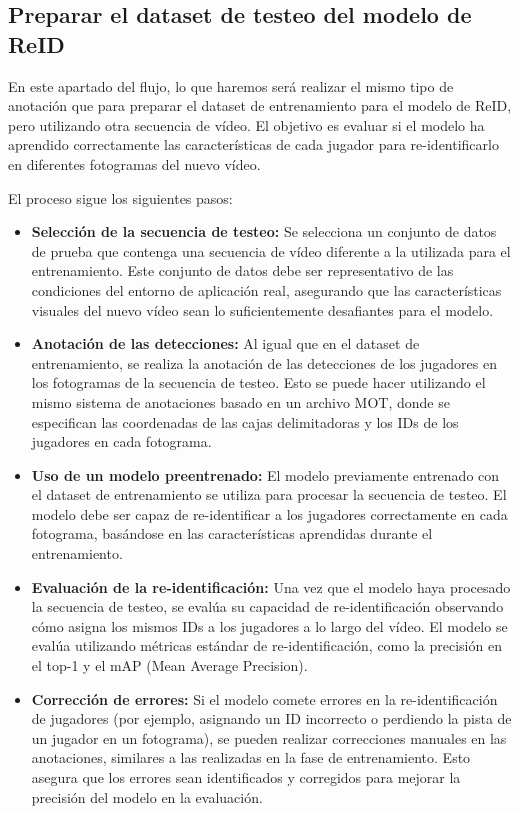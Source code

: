 \documentclass[12pt, a4paper, twoside]{article}
\begin{document}
	
	\subsection{Preparar el dataset de testeo del modelo de ReID} 
	
	En este apartado del flujo, lo que haremos será realizar el mismo tipo de anotación que para preparar el dataset de entrenamiento para el modelo de ReID, pero utilizando otra secuencia de vídeo. El objetivo es evaluar si el modelo ha aprendido correctamente las características de cada jugador para re-identificarlo en diferentes fotogramas del nuevo vídeo.
	
	El proceso sigue los siguientes pasos:
	
	\begin{itemize}
		\item \textbf{Selección de la secuencia de testeo:} Se selecciona un conjunto de datos de prueba que contenga una secuencia de vídeo diferente a la utilizada para el entrenamiento. Este conjunto de datos debe ser representativo de las condiciones del entorno de aplicación real, asegurando que las características visuales del nuevo vídeo sean lo suficientemente desafiantes para el modelo.
		
		\item \textbf{Anotación de las detecciones:} Al igual que en el dataset de entrenamiento, se realiza la anotación de las detecciones de los jugadores en los fotogramas de la secuencia de testeo. Esto se puede hacer utilizando el mismo sistema de anotaciones basado en un archivo MOT, donde se especifican las coordenadas de las cajas delimitadoras y los IDs de los jugadores en cada fotograma.
		
		\item \textbf{Uso de un modelo preentrenado:} El modelo previamente entrenado con el dataset de entrenamiento se utiliza para procesar la secuencia de testeo. El modelo debe ser capaz de re-identificar a los jugadores correctamente en cada fotograma, basándose en las características aprendidas durante el entrenamiento.
		
		\item \textbf{Evaluación de la re-identificación:} Una vez que el modelo haya procesado la secuencia de testeo, se evalúa su capacidad de re-identificación observando cómo asigna los mismos IDs a los jugadores a lo largo del vídeo. El modelo se evalúa utilizando métricas estándar de re-identificación, como la precisión en el top-1 y el mAP (Mean Average Precision).
		
		\item \textbf{Corrección de errores:} Si el modelo comete errores en la re-identificación de jugadores (por ejemplo, asignando un ID incorrecto o perdiendo la pista de un jugador en un fotograma), se pueden realizar correcciones manuales en las anotaciones, similares a las realizadas en la fase de entrenamiento. Esto asegura que los errores sean identificados y corregidos para mejorar la precisión del modelo en la evaluación.
	\end{itemize}
	
\end{document}

